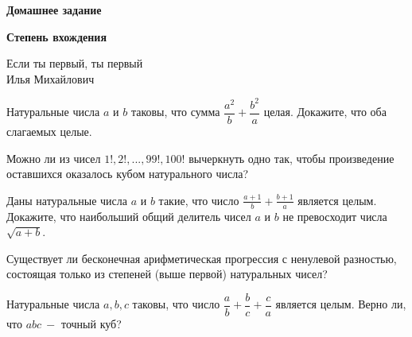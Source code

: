 \centerline{\bf \Huge Домашнее задание}
\centerline{\bf \Huge Степень вхождения}

\begin{flushright}
        \scriptsize{Если ты первый, ты первый\\ Илья Михайлович}
\end{flushright}

Натуральные числа $a$ и $b$ таковы, что сумма $\dfrac{a^2}{b} + \dfrac{b^2}{a}$ целая. Докажите, что оба слагаемых целые.

Можно ли из чисел $1!,2!,...,99!,100!$   вычеркнуть одно так, чтобы произведение оставшихся оказалось кубом натурального числа?


Даны натуральные числа $a$ и $b$ такие, что число $\frac{a+1}{b}+\frac{b+1}{a}$ является целым. Докажите, что наибольший общий делитель чисел $a$ и $b$ не превосходит числа $\sqrt{a+b}$.

Существует ли бесконечная арифметическая прогрессия с ненулевой разностью, состоящая только из степеней (выше первой) натуральных чисел?

Натуральные числа $a, b, c$ таковы, что число $\dfrac{a}{b} + \dfrac{b}{c} +\dfrac{c}{a}$ является целым. Верно ли, что  $abc \ - $ точный куб?
